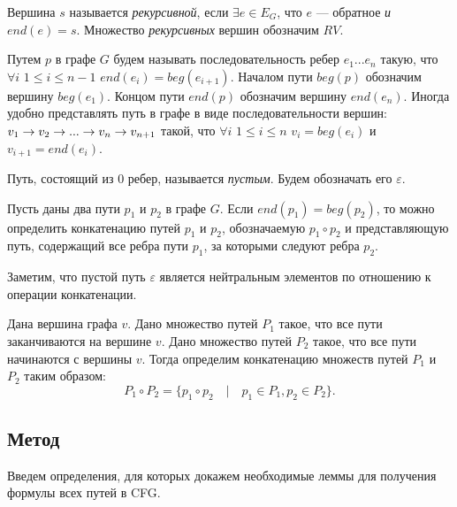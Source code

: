 \begin{defn}\label{recursiveVertex}
Вершина $s$ называется \emph{рекурсивной}, если $\exists e \in E_G$, что $e$ --- обратное \emph{и} $end(e) = s$. 
Множество \emph{рекурсивных} вершин обозначим $RV$.
\end{defn}

\begin{defn}
Путем $p$ в графе $G$ будем называть последовательность ребер $e_1...e_n$ такую,
что $\forall i$ $ 1 \leq i \leq n - 1$ $end(e_i) = beg(e_{i+1})$.
Началом пути $beg(p)$ обозначим вершину $beg(e_1)$.
Концом пути $end(p)$ обозначим вершину $end(e_n)$.
Иногда удобно представлять путь в графе в виде последовательности вершин:
$v_1 \rightarrow v_2 \rightarrow ... \rightarrow v_n \rightarrow v_{n + 1}$ такой, что $\forall i$ $1 \leq i \leq n$ $v_i = beg(e_i)$ и $v_{i+1} = end(e_i)$.
\end{defn}

\begin{defn}
Путь, состоящий из 0 ребер, называется \emph{пустым}.
Будем обозначать его $\varepsilon$.
\end{defn}

\begin{defn}
Пусть даны два пути $p_1$ и $p_2$ в графе $G$.
Если $end(p_1) = beg(p_2)$, то можно определить конкатенацию путей $p_1$ и $p_2$, обозначаемую $p_1 \circ p_2$ и представляющую путь, содержащий все ребра пути $p_1$, за которыми следуют ребра $p_2$.

Заметим, что пустой путь $\varepsilon$ является нейтральным элементов по отношению к операции конкатенации.
\end{defn}

\begin{defn}
Дана вершина графа $v$.
Дано множество путей $P_1$ такое, что все пути заканчиваются на вершине $v$.
Дано множество путей $P_2$ такое, что все пути начинаются с вершины $v$.
Тогда определим конкатенацию множеств путей $P_1$ и $P_2$ таким образом:
$$P_1 \circ P_2 = \{p_1 \circ p_2 \quad | \quad p_1 \in P_1, p_2 \in P_2 \}.$$
\end{defn}

\subsection{Метод}
Введем определения, для которых докажем необходимые леммы для получения формулы всех путей в CFG.


